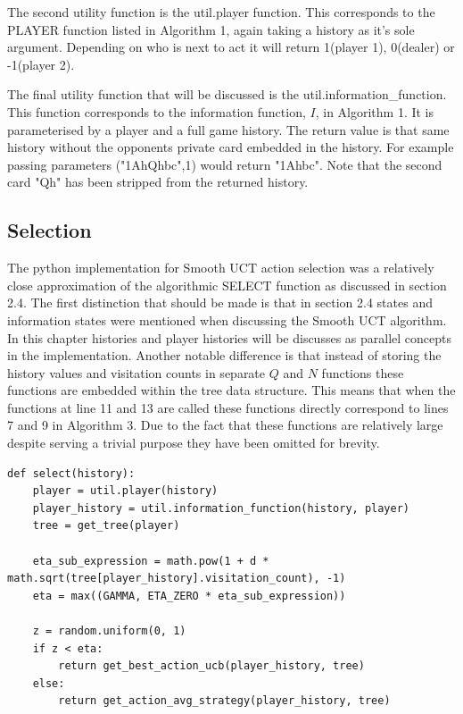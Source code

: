 The second utility function is the util.player function.
This corresponds to the PLAYER function listed in Algorithm 1, again taking a history as it's sole argument.
Depending on who is next to act it will return 1(player 1), 0(dealer) or -1(player 2).

The final utility function that will be discussed is the util.information\_function.
This function corresponds to the information function, $I$, in Algorithm 1.
It is parameterised by a player and a full game history.
The return value is that same history without the opponents private card
embedded in the history.
For example passing parameters ("1AhQhbc",1) would return "1Ahbc".
Note that the second card "Qh" has been stripped from the returned history.

\subsection{Selection}\label{subsec:selection}
The python implementation for Smooth UCT action selection was a relatively close approximation of the
algorithmic SELECT function as discussed in section 2.4.
The first distinction that should be made is that in section 2.4 states and information
states were mentioned when discussing the Smooth UCT algorithm.
In this chapter histories and player histories will be discusses as parallel concepts in the implementation.
Another notable difference is that instead of storing the history values and visitation
counts in separate $Q$ and $N$ functions these functions are embedded within the tree data
structure.
This means that when the functions at line 11 and 13 are called these
functions directly correspond to lines 7 and 9 in Algorithm 3.
Due to the fact that these functions are relatively large despite serving a trivial
purpose they have been omitted for brevity.

\begin{lstlisting}[style=Python]
def select(history):
    player = util.player(history)
    player_history = util.information_function(history, player)
    tree = get_tree(player)

    eta_sub_expression = math.pow(1 + d * math.sqrt(tree[player_history].visitation_count), -1)
    eta = max((GAMMA, ETA_ZERO * eta_sub_expression))

    z = random.uniform(0, 1)
    if z < eta:
        return get_best_action_ucb(player_history, tree)
    else:
        return get_action_avg_strategy(player_history, tree)
\end{lstlisting}


